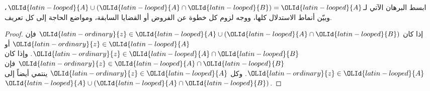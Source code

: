 \documentclass[../../../include/open-logic-section]{subfiles}
\begin{document}
\begin{prob}
ابسط البرهان الآتي لـ$\OLId{latin-looped}{A} \cup (\OLId{latin-looped}{A} \cap \OLId{latin-looped}{B}) = \OLId{latin-looped}{A}$، وبيّن أنماط الاستدلال
كلها، ووجه لزوم كل خطوة عن الفروض أو القضايا السابقة، ومواضع الحاجة
إلى كل تعريف.
\begin{proof}
  إذا كان $\OLId{latin-ordinary}{z} \in \OLId{latin-looped}{A} \cup (\OLId{latin-looped}{A} \cap \OLId{latin-looped}{B})$ فإن $\OLId{latin-ordinary}{z} \in \OLId{latin-looped}{A}$ أو
  $\OLId{latin-ordinary}{z} \in \OLId{latin-looped}{A} \cap \OLId{latin-looped}{B}$. وإذا كان $\OLId{latin-ordinary}{z} \in \OLId{latin-looped}{A} \cap \OLId{latin-looped}{B}$ فإن $\OLId{latin-ordinary}{z} \in \OLId{latin-looped}{A}$. وكل
  $\OLId{latin-ordinary}{z} \in \OLId{latin-looped}{A}$ ينتمي أيضاً إلى $\OLId{latin-looped}{A} \cup (\OLId{latin-looped}{A} \cap \OLId{latin-looped}{B})$.
\end{proof}
\end{prob}
\end{document}
